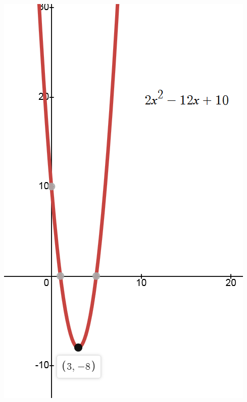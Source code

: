 \documentclass[a4paper,12pt]{article}
\begin{document}
\begin{enumerate}
    \begin{center}
        \includegraphics[scale=0.4]{Figur 7.png}
    \end{center}

    
\end{enumerate}
\end{document}
